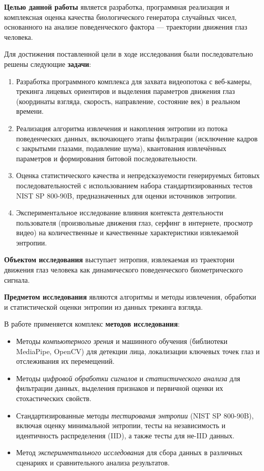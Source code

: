 \documentclass[14pt, a4paper]{extreport}
\begin{document}
\textbf{Целью данной работы} является разработка, программная реализация и комплексная оценка качества биологического генератора случайных чисел, основанного на анализе поведенческого фактора --- траектории движения глаз человека.

Для достижения поставленной цели в ходе исследования были последовательно решены следующие \textbf{задачи}:
\begin{enumerate}
    \item Разработка программного комплекса для захвата видеопотока с веб-камеры, трекинга лицевых ориентиров и выделения параметров движения глаз (координаты взгляда, скорость, направление, состояние век) в реальном времени.
    \item Реализация алгоритма извлечения и накопления энтропии из потока поведенческих данных, включающего этапы фильтрации (исключение кадров с закрытыми глазами, подавление шума), квантования извлечённых параметров и формирования битовой последовательности.
    \item Оценка статистического качества и непредсказуемости генерируемых битовых последовательностей с использованием набора стандартизированных тестов NIST SP 800-90B, предназначенных для оценки источников энтропии.
    \item Экспериментальное исследование влияния контекста деятельности пользователя (произвольные движения глаз, серфинг в интернете, просмотр видео) на количественные и качественные характеристики извлекаемой энтропии.
\end{enumerate}

\textbf{Объектом исследования} выступает энтропия, извлекаемая из траектории движения глаз человека как динамического поведенческого биометрического сигнала.

\textbf{Предметом исследования} являются алгоритмы и методы извлечения, обработки и статистической оценки энтропии из данных трекинга взгляда.

В работе применяется комплекс \textbf{методов исследования}:
\begin{itemize}
    \item Методы \textit{компьютерного зрения} и машинного обучения (библиотеки MediaPipe, OpenCV) для детекции лица, локализации ключевых точек глаз и отслеживания их перемещений.
    \item Методы \textit{цифровой обработки сигналов} и \textit{статистического анализа} для фильтрации данных, выделения признаков и первичной оценки их стохастических свойств.
    \item Стандартизированные методы \textit{тестирования энтропии} (NIST SP 800-90B), включая оценку минимальной энтропии, тесты на независимость и идентичность распределения (IID), а также тесты для не-IID данных.
    \item Метод \textit{экспериментального исследования} для сбора данных в различных сценариях и сравнительного анализа результатов.
\end{itemize}
\end{document}
